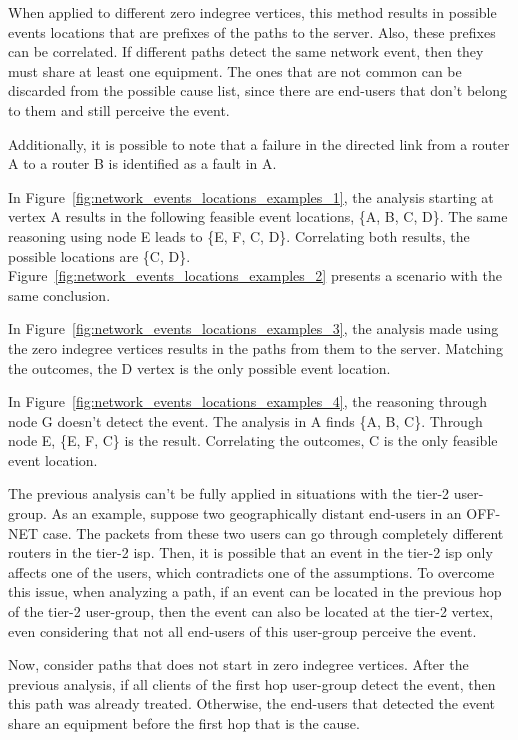 When applied to different zero indegree vertices,
this method results in possible events locations that are prefixes of
the paths to the server.
Also, these prefixes can be correlated.
If different paths detect the same network
event, then they must share at least one equipment. The
ones that are not common can be discarded from the possible cause list, since
there are end-users that don't belong to them and still perceive the event.

Additionally, it is possible to note that a failure in the directed link from a
router A to a router B is identified as a fault in A.

In Figure~\ref{fig:network_events_locations_examples_1}, the analysis
starting at vertex A results in the following feasible event locations,
\{A, B, C, D\}. The same reasoning using node E leads to
\{E, F, C, D\}. Correlating both results, the possible locations are \{C, D\}.
Figure~\ref{fig:network_events_locations_examples_2} presents a scenario with
the same conclusion.

In Figure~\ref{fig:network_events_locations_examples_3}, the analysis made
using the zero indegree vertices results in the paths from them to the server.
Matching the outcomes, the D vertex is the only possible event location.

In Figure~\ref{fig:network_events_locations_examples_4}, the reasoning through
node G doesn't detect the event. The analysis in A finds \{A, B, C\}. Through
node E, \{E, F, C\} is the result.
Correlating the outcomes, C is the only feasible event location.

The previous analysis can't be fully applied in situations with the tier-2
user-group.
As an example, suppose two geographically distant end-users in an OFF-NET case.
The packets from these two users can go through completely different routers in
the tier-2 \gls*{isp}. Then, it is possible that an event in the tier-2 \gls*{isp} only
affects one of the users, which contradicts one of the assumptions.
To overcome this issue, when analyzing a path, if an event can be located in the
previous hop of the tier-2 user-group, then the event can also be located at
the tier-2 vertex, even considering that not all end-users of this user-group
perceive the event.

Now, consider paths that does not start in zero indegree vertices.
After the previous analysis,
if all clients of the first hop user-group detect the event, then this
path was already treated. Otherwise, the end-users that detected the event
share an equipment before the first hop that is the cause.

